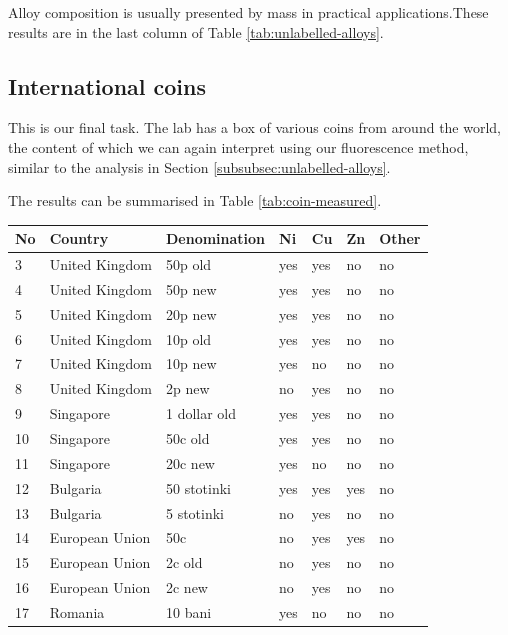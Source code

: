 \documentclass[11pt,a4paper,twoside,onecolumn]{article}
\begin{document}
Alloy composition is usually presented by mass in practical applications.These results are in the last column of Table \ref{tab:unlabelled-alloys}.

\subsection{International coins}
This is our final task. The lab has a box of various coins from around the world, the content of which we can again interpret using our fluorescence method, similar to the analysis in Section \ref{subsubsec:unlabelled-alloys}.

The results can be summarised in Table \ref{tab:coin-measured}.

\begin{table}[!htbp]
    \centering
    \begin{tabular}{@{}lllllll@{}}
    \toprule
    No & Country        & Denomination   & Ni  & Cu  & Zn  & Other \\ \midrule
    3  & United Kingdom & 50p old        & yes & yes & no  & no    \\
    4  & United Kingdom & 50p new        & yes & yes & no  & no    \\
    5  & United Kingdom & 20p new        & yes & yes & no  & no    \\
    6  & United Kingdom & 10p old        & yes & yes & no  & no    \\
    7  & United Kingdom & 10p new        & yes & no  & no  & no    \\
    8  & United Kingdom & 2p new         & no  & yes & no  & no    \\
    9  & Singapore      & 1 dollar old   & yes & yes & no  & no    \\
    10 & Singapore      & 50c old        & yes & yes & no  & no    \\
    11 & Singapore      & 20c new        & yes & no  & no  & no    \\
    12 & Bulgaria       & 50 stotinki    & yes & yes & yes & no    \\
    13 & Bulgaria       & 5 stotinki     & no  & yes & no  & no    \\
    14 & European Union & 50c            & no  & yes & yes & no    \\
    15 & European Union & 2c old         & no  & yes & no  & no    \\
    16 & European Union & 2c new         & no  & yes & no  & no    \\
    17 & Romania        & 10 bani        & yes & no  & no  & no    \\

\end{tabular}
\end{table}
\end{document}
